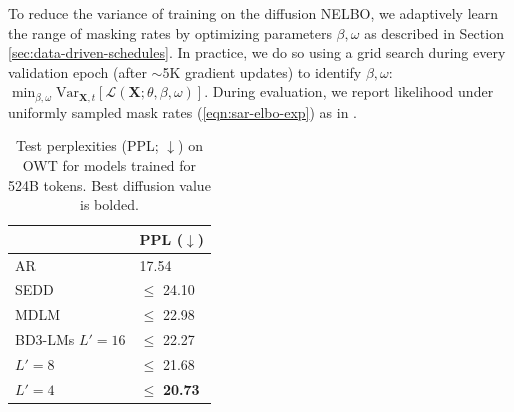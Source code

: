 \documentclass{article} %
\newcommand{\vkl}[1]{\textcolor{blue}{[VK: #1]}}
\def\algos{BD3-LMs}
\def\owt{OWT}
\begin{document}
To reduce the variance of training on the diffusion NELBO, we adaptively learn the range of masking rates by optimizing parameters $\beta, \omega$ as described in Section \ref{sec:data-driven-schedules}. In practice, we do so using a grid search during every validation epoch (after $\sim$5K gradient updates) to identify $\beta, \omega$: $\min_{\beta, \omega} \text{Var}_{\mathbf{X}, t} \left[ \mathcal{L}(\mathbf{X}; \theta, \beta, \omega) \right]$. During evaluation, we report likelihood under uniformly sampled mask rates (\ref{eqn:sar-elbo-exp}) as in \citet{austin2021structured, sahoo2024simple}.

\begin{table}
\vspace{-10pt}
\small
\centering
    \caption{Test perplexities (PPL; $\downarrow$) on \owt{} for models trained for 524B tokens. Best diffusion value is bolded.}\label{owt-ppl}
  \begin{tabular}{ll}
    \toprule
    & PPL ($\downarrow$) \\
    \midrule
    AR~\citep{sahoo2024simple} & 17.54 \\
    \midrule
    SEDD~\citep{lou2024discrete} & $\leq$ 24.10 \\
    MDLM~\citep{sahoo2024simple} & $\leq$ 22.98 \\
    \midrule
    \algos{} $L'=16$ & $\leq$ 22.27 \\
    \hspace{4.3em}$L'=8$ & $\leq$ 21.68  \\
    \hspace{4.3em}$L'=4$ & $\leq$ \textbf{20.73} \\
    \bottomrule
  \end{tabular}
\vspace{-15pt}
\end{table}

\end{document}

